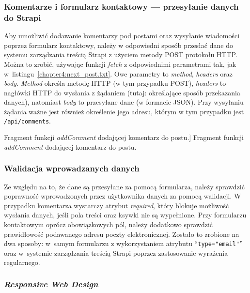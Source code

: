 \documentclass[a4paper, 12pt, twoside]{article}
\numberwithin{figure}{section}
\begin{document}
\begin{sloppypar}
\subsubsection*{Komentarze i formularz kontaktowy --- przesyłanie danych do Strapi}

Aby umożliwić dodawanie komentarzy pod postami oraz wysyłanie wiadomości poprzez formularz kontaktowy, należy w odpowiedni sposób przesłać dane do systemu zarządzania treścią Strapi z użyciem metody POST protokołu HTTP. Można to zrobić, używając funkcji \textit{fetch} z odpowiednimi parametrami tak, jak w~listingu~\ref{chapter4:next_post.txt}. Owe parametry to \textit{method}, \textit{headers} oraz \textit{body}. \textit{Method} określa metodę HTTP (w tym przypadku POST), \textit{headers} to nagłówki HTTP do wysłania z żądaniem (tutaj: określające sposób przekazania danych), natomiast \textit{body} to przesyłane dane (w formacie JSON). Przy wysyłaniu żądania ważne jest również określenie jego adresu, którym w tym przypadku jest \texttt{/api/comments}. 

\begin{code}[htbp]
    
    \caption
    [Fragment funkcji \textit{addComment} dodającej komentarz do postu.]
    {Fragment funkcji \textit{addComment} dodającej komentarz do postu.}
    \label{chapter4:next_post.txt}
\end{code}

\subsubsection*{Walidacja wprowadzanych danych}

Ze względu na to, że dane są przesyłane za pomocą formularza, należy sprawdzić poprawność wprowadzonych przez użytkownika danych za pomocą walidacji. W przypadku komentarza wystarczy atrybut \textit{required}, który blokuje możliwość wysłania danych, jeśli pola treści oraz ksywki nie są wypełnione. Przy formularzu kontaktowym oprócz obowiązkowych pól, należy dodatkowo sprawdzić prawidłowość podawanego adresu poczty elektronicznej. Zostało to zrobione na dwa sposoby: w~samym formularzu z wykorzystaniem atrybutu ``\texttt{type="email"}'' oraz w~systemie zarządzania treścią Strapi poprzez zastosowanie wyrażenia regularnego.

\subsubsection*{\textit{Responsive Web Design}}


\end{sloppypar}
\end{document}
